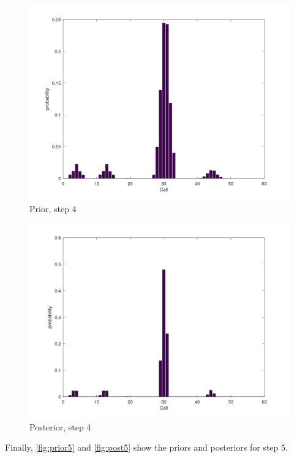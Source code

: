 \documentclass[11pt]{article}
\begin{document}
        \begin{figure}[H]
            \centering
            \includegraphics[width=1.0\textwidth]{../images/prior4v2}
            \caption{Prior, step 4}
            \label{fig:prior4}
        \end{figure}
        \begin{figure}[H]
            \centering
            \includegraphics[width=1.0\textwidth]{../images/posterior4v2}
            \caption{Posterior, step 4}
            \label{fig:post4}
        \end{figure}
    Finally, \autoref{fig:prior5} and \autoref{fig:post5} show the priors and posteriors for step $5$.
\end{document}
